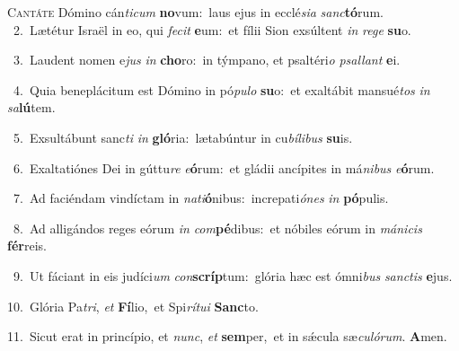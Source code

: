\lettrine{\initial\textcolor{\initialcolor}{C}}{antáte} Dómino cán\-\textit{ti}\-\textit{cum} \textbf{no}\-vum:~\star laus ejus in ecclé\-\textit{si}\-\textit{a} \textit{sanc}\-\textbf{tó}rum.\\
{\numbfont\textcolor{\numbcolor}{~2.}}~Lætétur Israël in eo, qui \textit{fe}\-\textit{cit} \textbf{e}\-um:~\star et fílii Sion exsúltent \textit{in} \textit{re}\-\textit{ge} \textbf{su}\-o.\par
{\numbfont\textcolor{\numbcolor}{~3.}}~Laudent nomen e\textit{jus} \textit{in} \textbf{cho}\-ro:~\star in týmpano, et psaltéri\textit{o} \textit{psal}\-\textit{lant} \textbf{e}\-i.\par
{\numbfont\textcolor{\numbcolor}{~4.}}~Quia beneplácitum est Dómino in pó\-\textit{pu}\-\textit{lo} \textbf{su}\-o:~\star et exaltábit mansué\textit{tos} \textit{in} \textit{sa}\-\textbf{lú}tem.\par
{\numbfont\textcolor{\numbcolor}{~5.}}~Exsultábunt sanc\textit{ti} \textit{in} \textbf{gló}\-ria:~\star lætabúntur in cu\-\textit{bí}\-\textit{li}\textit{bus} \textbf{su}\-is.\par
{\numbfont\textcolor{\numbcolor}{~6.}}~Exaltatiónes Dei in gúttu\textit{re} \textit{e}\-\textbf{ó}rum:~\star et gládii ancípites in má\-\textit{ni}\-\textit{bus} \textit{e}\-\textbf{ó}rum.\par
{\numbfont\textcolor{\numbcolor}{~7.}}~Ad faciéndam vindíctam in \textit{na}\-\textit{ti}\textbf{ó}nibus:~\star increpati\-\textit{ó}\-\textit{nes} \textit{in} \textbf{pó}\-pulis.\par
{\numbfont\textcolor{\numbcolor}{~8.}}~Ad alligándos reges eórum \textit{in} \textit{com}\-\textbf{pé}dibus:~\star et nóbiles eórum in \textit{má}\-\textit{ni}\textit{cis} \textbf{fér}\-reis.\par
{\numbfont\textcolor{\numbcolor}{~9.}}~Ut fáciant in eis judíci\textit{um} \textit{con}\-\textbf{scríp}tum:~\star glória hæc est ómni\textit{bus} \textit{sanc}\-\textit{tis} \textbf{e}\-jus.\par
{\numbfont\textcolor{\numbcolor}{10.}}~Glória Pa\-\textit{tri}\-, \textit{et} \textbf{Fí}\-lio,~\star et Spi\-\textit{rí}\-\textit{tu}\textit{i} \textbf{Sanc}\-to.\par
{\numbfont\textcolor{\numbcolor}{11.}}~Sicut erat in princípio, et \textit{nunc}\-, \textit{et} \textbf{sem}\-per,~\star et in sǽcula sæ\-\textit{cu}\-\textit{ló}\textit{rum}. \textbf{A}\-men.\par
